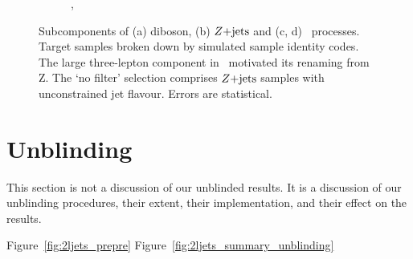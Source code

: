 \begin{figure}[tp]
\begin{subfigure}{0.48\textwidth}
\caption{\srllbb, \topother}
\label{fig:2ljets_splits_topother2}
\end{subfigure}
\caption[
Subcomponents of diboson, $\zjets$ and rare-top processes.
]{%
Subcomponents of (a) diboson, (b) $\zjets$ and (c, d) \topother\ processes.
Target samples broken down by simulated sample identity codes.
The large three-lepton component in \crvz\ motivated its renaming from \crz Z.
The `no filter' selection comprises $\zjets$ samples with unconstrained jet
flavour.
Errors are statistical.
}
\label{fig:2ljets_splits}
\end{figure}


\section{Unblinding}
\label{sec:2ljets_unblinding}
This section is not a discussion of our unblinded results.
It is a discussion of our unblinding procedures,
their extent, their implementation, and their effect on the results.

Figure~\ref{fig:2ljets_prepre}
Figure~\ref{fig:2ljets_summary_unblinding}

